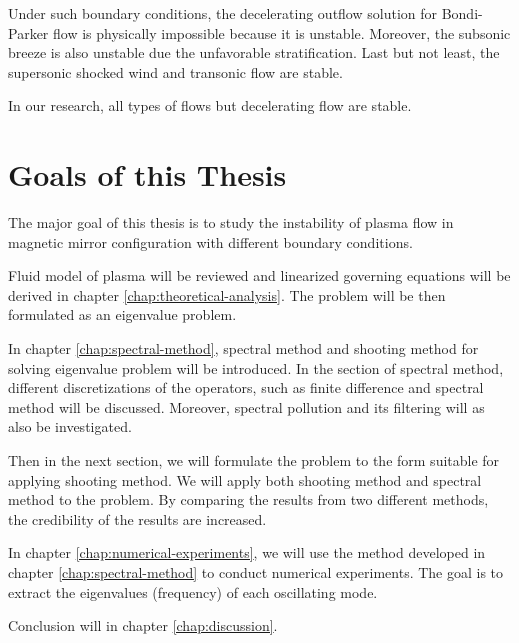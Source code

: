Under such boundary conditions, the decelerating outflow solution for Bondi-Parker flow is physically impossible because it is unstable. Moreover, the subsonic breeze is also unstable due the unfavorable stratification. Last but not least, the supersonic shocked wind and transonic flow are stable. \cite{velli_hydrodynamics_2001}

In our research, all types of flows but decelerating flow are stable.

\section{Goals of this Thesis}
The major goal of this thesis is to study the instability of plasma flow in magnetic mirror configuration with different boundary conditions.

Fluid model of plasma will be reviewed and linearized governing equations will be derived in chapter \ref{chap:theoretical-analysis}. The problem will be then formulated as an eigenvalue problem.

In chapter \ref{chap:spectral-method}, spectral method and shooting method for solving eigenvalue problem will be introduced.
In the section of spectral method, different discretizations of the operators, such as finite difference and spectral method will be discussed.
Moreover, spectral pollution and its filtering will as also be investigated.

Then in the next section, we will formulate the problem to the form suitable for applying shooting method. We will apply both shooting method and spectral method to the problem.
By comparing the results from two different methods, the credibility of the results are increased.

In chapter \ref{chap:numerical-experiments}, we will use the method developed in chapter \ref{chap:spectral-method} to conduct numerical experiments. The goal is to extract the eigenvalues (frequency) of each oscillating mode.

Conclusion will in chapter \ref{chap:discussion}.
